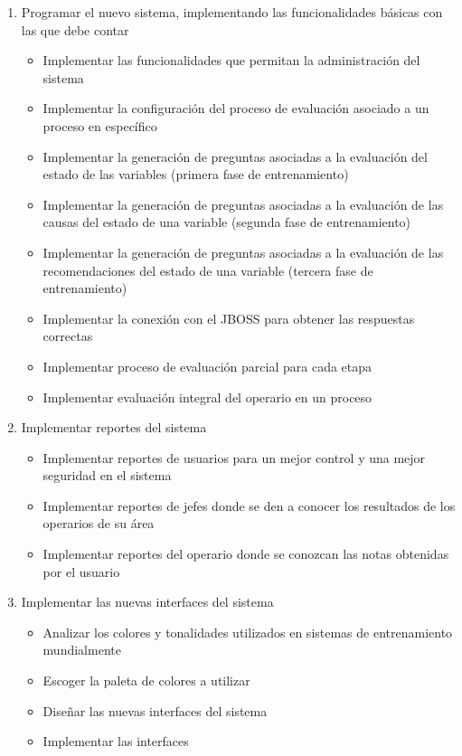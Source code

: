 \begin{itemize}
\begin{enumerate}
\item Programar el nuevo sistema, implementando las funcionalidades básicas con las que debe contar
\begin{itemize}
\item Implementar las funcionalidades que permitan la administración del sistema
\item Implementar la configuración del proceso de evaluación asociado a un proceso en específico
\item Implementar la generación de preguntas asociadas a la evaluación del estado de las variables (primera fase de entrenamiento)
\item Implementar la generación de preguntas asociadas a la evaluación de las causas del estado de una variable (segunda fase de entrenamiento)
\item Implementar la generación de preguntas asociadas a la evaluación de las recomendaciones del estado de una variable (tercera fase de entrenamiento)
\item Implementar la conexión con el JBOSS para obtener las respuestas correctas
\item Implementar proceso de evaluación parcial para cada etapa
\item Implementar evaluación integral del operario en un proceso
\end{itemize}

\item Implementar reportes del sistema
\begin{itemize}
\item Implementar reportes de usuarios para un mejor control y una mejor seguridad en el sistema
\item Implementar reportes de jefes donde se den a conocer los resultados de los operarios de su área
\item Implementar reportes del operario donde se conozcan las notas obtenidas por el usuario
\end{itemize}

\item Implementar las nuevas interfaces del sistema
\begin{itemize}
\item Analizar los colores y tonalidades utilizados en sistemas de entrenamiento mundialmente 
\item Escoger la paleta de colores a utilizar
\item Diseñar las nuevas interfaces del sistema
\item Implementar las interfaces
\end{itemize}


\end{enumerate}
\end{itemize}
